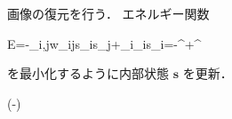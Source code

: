 画像の復元を行う．
エネルギー関数


E=-{}\sum _{{i,j}}{w_{{ij}}{s_{i}}{s_{j}}}+\sum _{i}{\theta _{i}}{s_{i}}=-{}^\top{}+\mathbf{\theta}^\top{}


を最小化するように内部状態 $\mathbf{s}$ を更新．


\leftarrow {}\left(-\mathbf{\theta}\right)
